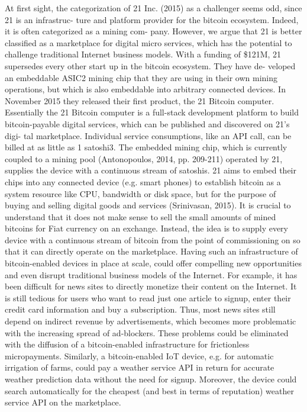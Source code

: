 At first sight, the categorization of 21 Inc. (2015) as a challenger seems odd, since 21 is an infrastruc- ture and platform provider for the bitcoin ecosystem. Indeed, it is often categorized as a mining com- pany. However, we argue that 21 is better classified as a marketplace for digital micro services, which has the potential to challenge traditional Internet business models.
With a funding of \$121M, 21 supersedes every other start up in the bitcoin ecosystem. They have de- veloped an embeddable ASIC2 mining chip that they are using in their own mining operations, but which is also embeddable into arbitrary connected devices. In November 2015 they released their first product, the 21 Bitcoin computer. Essentially the 21 Bitcoin computer is a full-stack development platform to build bitcoin-payable digital services, which can be published and discovered on 21’s digi- tal marketplace. Individual service consumptions, like an API call, can be billed at as little as 1 satoshi3. The embedded mining chip, which is currently coupled to a mining pool (Antonopoulos, 2014, pp. 209-211) operated by 21, supplies the device with a continuous stream of satoshis.
21 aims to embed their chips into any connected device (e.g. smart phones) to establish bitcoin as a system resource like CPU, bandwidth or disk space, but for the purpose of buying and selling digital goods and services (Srinivasan, 2015). It is crucial to understand that it does not make sense to sell the small amounts of mined bitcoins for Fiat currency on an exchange. Instead, the idea is to supply every device with a continuous stream of bitcoin from the point of commissioning on so that it can directly operate on the marketplace.
Having such an infrastructure of bitcoin-enabled devices in place at scale, could offer compelling new opportunities and even disrupt traditional business models of the Internet. For example, it has been difficult for news sites to directly monetize their content on the Internet. It is still tedious for users who want to read just one article to signup, enter their credit card information and buy a subscription. Thus, most news sites still depend on indirect revenue by advertisements, which becomes more problematic with the increasing spread of ad-blockers. These problems could be eliminated with the diffusion of a bitcoin-enabled infrastructure for frictionless micropayments. Similarly, a bitcoin-enabled IoT device, e.g. for automatic irrigation of farms, could pay a weather service API in return for accurate weather prediction data without the need for signup. Moreover, the device could search automatically for the cheapest (and best in terms of reputation) weather service API on the marketplace.
